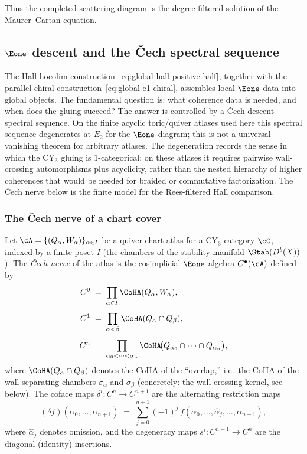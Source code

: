 Thus the completed scattering diagram is the degree-filtered solution of
the Maurer--Cartan equation.

\medskip


\subsection{\texorpdfstring{$\Eone$}{E1} descent and the \v{C}ech spectral sequence}
\label{subsec:e1-descent}

The Hall hocolim construction~\eqref{eq:global-hall-positive-half}, together with the parallel chiral construction~\eqref{eq:global-e1-chiral}, assembles local $\Eone$ data into global objects. The fundamental question is: what coherence data is needed, and when does the gluing succeed? The answer is controlled by a \v{C}ech descent spectral sequence. On the finite acyclic toric/quiver atlases used here this spectral sequence degenerates at $E_2$ for the $\Eone$ diagram; this is not a universal vanishing theorem for arbitrary atlases. The degeneration records the sense in which the CY$_3$ gluing is $1$-categorical: on these atlases it requires pairwise wall-crossing automorphisms plus acyclicity, rather than the nested hierarchy of higher coherences that would be needed for braided or commutative factorization. The \v{C}ech nerve below is the finite model for the Rees-filtered Hall comparison.

\subsubsection{The \v{C}ech nerve of a chart cover}
\label{subsubsec:cech-nerve}

Let $\cA = \{(Q_\alpha, W_\alpha)\}_{\alpha \in I}$ be a quiver-chart atlas for a CY$_3$ category $\cC$, indexed by a finite poset $I$ (the chambers of the stability manifold $\Stab(D^b(X))$). The \emph{\v{C}ech nerve} of the atlas is the cosimplicial $\Eone$-algebra $C^\bullet(\cA)$ defined by
\begin{align}
\label{eq:cech-nerve}
 C^0 &\;=\; \prod_{\alpha \in I} \CoHA(Q_\alpha, W_\alpha), \notag \\[4pt]
 C^1 &\;=\; \prod_{\alpha < \beta} \CoHA(Q_\alpha \cap Q_\beta), \\[4pt]
 C^n &\;=\; \prod_{\alpha_0 < \cdots < \alpha_n} \CoHA\!\bigl(Q_{\alpha_0} \cap \cdots \cap Q_{\alpha_n}\bigr), \notag
\end{align}
where $\CoHA(Q_\alpha \cap Q_\beta)$ denotes the CoHA of the ``overlap,'' i.e.\ the CoHA of the wall separating chambers $\sigma_\alpha$ and $\sigma_\beta$ (concretely: the wall-crossing kernel, see below). The coface maps $\delta^i \colon C^n \to C^{n+1}$ are the alternating restriction maps
\begin{equation}
\label{eq:cech-coface}
 (\delta f)(\alpha_0, \ldots, \alpha_{n+1}) \;=\; \sum_{j=0}^{n+1} (-1)^j \, f(\alpha_0, \ldots, \widehat{\alpha}_j, \ldots, \alpha_{n+1}),
\end{equation}
where $\widehat{\alpha}_j$ denotes omission, and the degeneracy maps $s^i \colon C^{n+1} \to C^n$ are the diagonal (identity) insertions.

